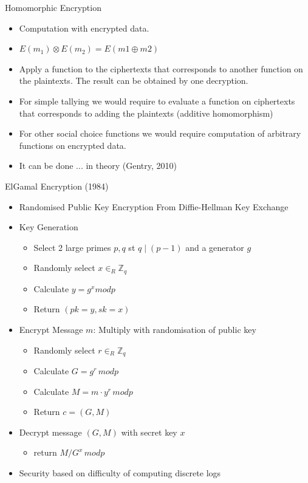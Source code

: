 \documentclass{beamer}
\begin{document}
\begin{frame}{Homomorphic Encryption}
\begin{itemize}
\item Computation with encrypted data.
\item $E(m_1) \otimes E(m_2) = E(m1 \oplus m2)$
\item Apply a function to the ciphertexts that corresponds to another function on the plaintexts. The result can be obtained by one decryption.
\item For simple tallying we would require to evaluate a function on ciphertexts that corresponds to adding the plaintexts (additive homomorphism)
\item For other social choice functions we would require computation of arbitrary functions on encrypted data.
\item It can be done ... in theory (Gentry, 2010)
\end{itemize}
\end{frame}

\begin{frame}{ElGamal Encryption (1984)}
\begin{itemize}
\item Randomised Public Key Encryption From Diffie-Hellman Key Exchange
\item Key Generation
\begin{itemize}
\item Select 2 large primes $p,q$ st $q \mid (p-1)$ and a generator $g$
\item Randomly select $ x \in_R \mathbb{Z}_q $
\item Calculate $ y = g^x mod p $
\item Return $ (pk = y, sk = x)$
\end{itemize}
\item Encrypt Message $m$: Multiply with randomisation of public key
\begin{itemize}
\item  Randomly select $r \in_R \mathbb{Z}_q$
\item  Calculate $G = g^r \, mod p$
\item  Calculate $M = m \cdot y^r \, mod p$
\item  Return $ c = (G,M) $
\end{itemize}
\item Decrypt message $(G,M)$ with secret key $x$
\begin{itemize}
\item  return $M/G^x \, mod p$
\end{itemize}
\item Security based on difficulty of computing discrete logs
\end{itemize}
\end{frame}
\end{document}

